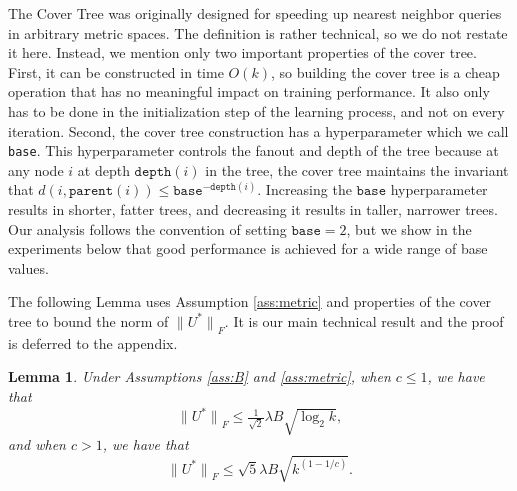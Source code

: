 \documentclass[twoside]{article}
\newtheorem{lemma}{Lemma}
\newcommand{\parent}[1]{\texttt{parent}({#1})}
\renewcommand{\star}[1]{{#1}^{*}}
\newcommand{\lF}[1]{{\lVert {#1} \rVert}_F}
\newcommand{\depth}[1]{\texttt{depth}({#1})}
\begin{document}
The Cover Tree was originally designed for speeding up nearest neighbor queries in arbitrary metric spaces.
The definition is rather technical, so we do not restate it here.
Instead, we mention only two important properties of the cover tree.
First, it can be constructed in time $O(k)$,
so building the cover tree is a cheap operation that has no meaningful impact on training performance.
It also only has to be done in the initialization step of the learning process, and not on every iteration.
Second, the cover tree construction has a hyperparameter which we call \texttt{base}.
This hyperparameter controls the fanout and depth of the tree because at any node $i$ at depth $\depth{i}$ in the tree,
the cover tree maintains the invariant that $d(i, \parent{i}) \le \texttt{base}^{-\depth{i}}$.
Increasing the $\texttt{base}$ hyperparameter results in shorter, fatter trees,
and decreasing it results in taller, narrower trees.
Our analysis follows the convention of setting $\texttt{base}=2$,
but we show in the experiments below that good performance is achieved for a wide range of base values.

The following Lemma uses Assumption \ref{ass:metric} and properties of the cover tree to bound the norm of $\lF{\star U}$.
It is our main technical result and the proof is deferred to the appendix.

\begin{lemma}
    \label{lemma:main}
    Under Assumptions \ref{ass:B} and \ref{ass:metric},
    when $c\le1$, we have that
    \begin{equation}
        \lF{\star U} \le \tfrac{1}{\sqrt2}\lambda B \sqrt{\log_2 k},
        \label{eq:c<=1}
    \end{equation}
    and when $c>1$, we have that
    \begin{equation}
        \lF{\star U} \le \sqrt{5}\lambda B \sqrt{k^{(1-1/c)}}.
        \label{eq:c>1}
    \end{equation}
\end{lemma}
\end{document}
